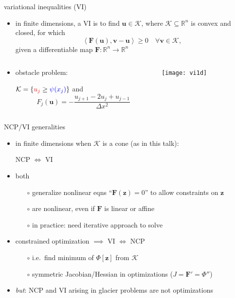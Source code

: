 \documentclass[xcolor={dvipsnames}]{beamer}
\newcommand\bu{\mathbf{u}}
\newcommand\bv{\mathbf{v}}
\newcommand\bz{\mathbf{z}}
\newcommand\bF{\mathbf{F}}
\newcommand\RR{\mathbb{R}}
\newcommand{\ip}[2]{\ensuremath{\left<#1,#2\right>}}
\begin{document}
\begin{frame}{variational inequalities (VI)}

\begin{itemize}
\item in finite dimensions, a VI is to find $\bu\in\mathcal{K}$, where $\mathcal{K}\subseteq \RR^n$ is convex and closed, for which
\begin{equation}
     \ip{\bF(\bu)}{\bv-\bu} \ge 0 \quad \forall \bv \in \mathcal{K},
\end{equation}
given a differentiable map $\bF:\RR^n \to \RR^n$
\end{itemize}

\begin{columns}
\begin{column}{0.4\textwidth}
\small
\begin{itemize}
\item obstacle problem:

$\mathcal{K} = \{{\color{red} u_j} \ge {\color{blue} \psi(x_j)}\}$ and
  $$F_j(\bu) = - \frac{u_{j+1} - 2 u_j + u_{j-1}}{\Delta x^2}$$
\end{itemize}
\end{column}
\begin{column}{0.6\textwidth}
\texttt{[image: vi1d]}
\end{column}
\end{columns}
\end{frame}


\begin{frame}{NCP/VI generalities}

\begin{itemize}
\item in finite dimensions when $\mathcal{K}$ is a cone (as in this talk):
\begin{center}
\alert{NCP $\iff$ VI}
\end{center}
\item both 
  \begin{itemize}
  \item[$\circ$]  generalize nonlinear eqns ``$\bF(\bz)=0$'' to allow constraints on $\bz$
  \item[$\circ$]  are nonlinear, even if $\bF$ is linear or affine
  \item[$\circ$]  in practice: need iterative approach to solve
  \end{itemize}
\item constrained optimization $\implies$ VI $\iff$ NCP
  \begin{itemize}
  \item[$\circ$]  i.e.~find minimum of $\Phi[\bz]$ from $\mathcal{K}$
  \item[$\circ$]  symmetric Jacobian/Hessian in optimizations ($J = \bF' = \Phi''$)
  \end{itemize}
\item \emph{but}: NCP and VI arising in glacier problems are \alert{not} optimizations
\end{itemize}
\end{frame}
\end{document}
